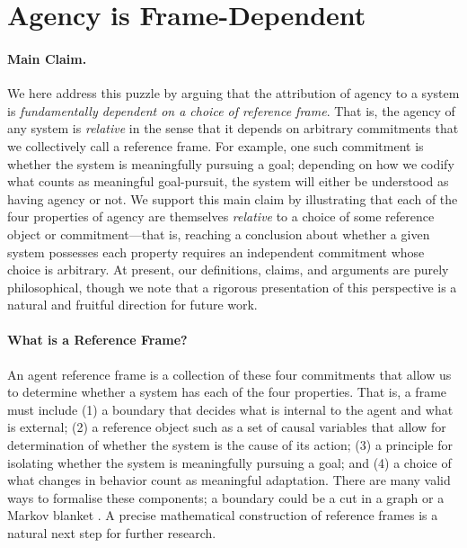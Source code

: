 \documentclass[11pt]{article} %
\begin{document}
\section{Agency is Frame-Dependent}


%
\paragraph{Main Claim.} We here address this puzzle by arguing that the attribution of agency to a system is \textit{fundamentally dependent on a choice of reference frame}. That is, the agency of any system is \textit{relative} in the sense that it depends on arbitrary commitments that we collectively call a reference frame. For example, one such commitment is whether the system is meaningfully pursuing a goal; depending on how we codify what counts as meaningful goal-pursuit, the system will either be understood as having agency or not.  %
%
We support this main claim by illustrating that each of the four properties of agency are themselves \textit{relative} to a choice of some reference object or commitment---that is, reaching a conclusion about whether a given system possesses each property requires an independent commitment whose choice is arbitrary.
%
At present, our definitions, claims, and arguments are purely philosophical, though we note that a rigorous presentation of this perspective is a natural and fruitful direction for future work. 


%
\paragraph{What is a Reference Frame?} An agent reference frame is a collection of these four commitments that allow us to determine whether a system has each of the four properties. That is, a frame must include (1) a boundary that decides what is internal to the agent and what is external; (2) a reference object such as a set of causal variables that allow for determination of whether the system is the cause of its action; (3) a principle for isolating whether the system is meaningfully pursuing a goal; and (4) a choice of what changes in behavior count as meaningful adaptation. There are many valid ways to formalise these components; a boundary could be a cut in a graph \citep{jiang2019value} or a Markov blanket \citep{friston2009reinforcement}. A precise mathematical construction of reference frames is a natural next step for further research. %
\end{document}
